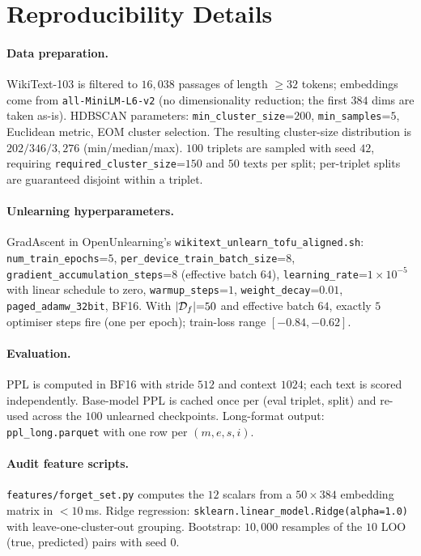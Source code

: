 \section{Reproducibility Details}
\label{app:repro}

\paragraph{Data preparation.} WikiText-103 is filtered to $16{,}038$ passages of length $\geq 32$ tokens; embeddings come from \texttt{all-MiniLM-L6-v2} (no dimensionality reduction; the first $384$ dims are taken as-is). HDBSCAN parameters: \texttt{min\_cluster\_size}{=}$200$, \texttt{min\_samples}{=}$5$, Euclidean metric, EOM cluster selection. The resulting cluster-size distribution is $202 / 346 / 3{,}276$ (min/median/max). $100$ triplets are sampled with seed $42$, requiring \texttt{required\_cluster\_size}{=}$150$ and $50$ texts per split; per-triplet splits are guaranteed disjoint within a triplet.

\paragraph{Unlearning hyperparameters.} GradAscent in OpenUnlearning's \texttt{wikitext\_unlearn\_tofu\_aligned.sh}: \texttt{num\_train\_epochs}{=}$5$, \texttt{per\_device\_train\_batch\_size}{=}$8$, \texttt{gradient\_accumulation\_steps}{=}$8$ (effective batch $64$), \texttt{learning\_rate}{=}$1\!\times\!10^{-5}$ with linear schedule to zero, \texttt{warmup\_steps}{=}$1$, \texttt{weight\_decay}{=}$0.01$, \texttt{paged\_adamw\_32bit}, BF16. With $|\mathcal{D}_f|{=}50$ and effective batch $64$, exactly $5$ optimiser steps fire (one per epoch); train-loss range $[-0.84, -0.62]$.

\paragraph{Evaluation.} PPL is computed in BF16 with stride $512$ and context $1024$; each text is scored independently. Base-model PPL is cached once per (eval triplet, split) and re-used across the $100$ unlearned checkpoints. Long-format output: \texttt{ppl\_long.parquet} with one row per $(m, e, s, i)$.

\paragraph{Audit feature scripts.} \texttt{features/forget\_set.py} computes the $12$ scalars from a $50\!\times\!384$ embedding matrix in $<\!10$\,ms. Ridge regression: \texttt{sklearn.linear\_model.Ridge(alpha=1.0)} with leave-one-cluster-out grouping. Bootstrap: $10{,}000$ resamples of the $10$ LOO (true, predicted) pairs with seed $0$.

